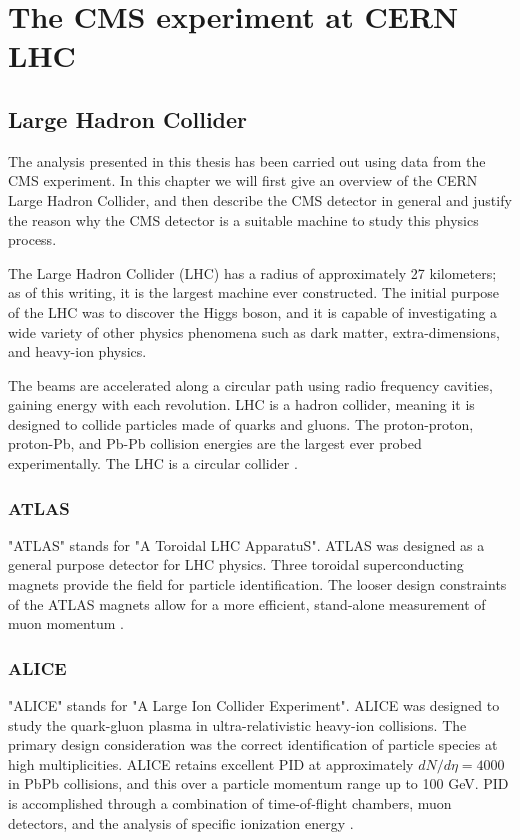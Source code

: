 \setlength\abovedisplayskip{0.4pt}
\setlength\belowdisplayskip{0.4pt}

\chapter{The CMS experiment at CERN LHC}

\section{Large Hadron Collider}

The analysis presented in this thesis has been carried out using data from the CMS experiment. In this chapter we will first give an overview of the CERN Large Hadron Collider, and then describe the CMS detector in general and justify the reason why the CMS detector is a suitable machine to study this physics process.

The Large Hadron Collider (LHC) has a radius of approximately 27 kilometers; as of this writing, it is the largest machine ever constructed. The initial purpose of the LHC was to discover the Higgs boson, and it is capable of investigating a wide variety of other physics phenomena such as dark matter, extra-dimensions, and heavy-ion physics.

The beams are accelerated along a circular path using radio frequency cavities, gaining energy with each revolution. LHC is a hadron collider, meaning it is designed to collide particles made of quarks and gluons. The proton-proton, proton-Pb, and Pb-Pb collision energies are the largest ever probed experimentally. The LHC is a circular collider \cite{Evans:2008zzb}.

\subsection{ATLAS}

"ATLAS" stands for "A Toroidal LHC ApparatuS". ATLAS was designed as a general purpose detector for LHC physics. Three toroidal superconducting magnets provide the field for particle identification. The looser design constraints of the ATLAS magnets allow for a more efficient, stand-alone measurement of muon momentum \cite{Aad:2008zzm}. 

\subsection{ALICE}

"ALICE" stands for "A Large Ion Collider Experiment". ALICE was designed to study the quark-gluon plasma in ultra-relativistic heavy-ion collisions. The primary design consideration was the correct identification of particle species at high multiplicities. ALICE retains excellent PID at approximately $dN / d\eta = 4000$ in PbPb collisions, and this over a particle momentum range up to 100 GeV. PID is accomplished through a combination of time-of-flight chambers, muon detectors, and the analysis of specific ionization energy \cite{Aamodt:2008zz}. 


